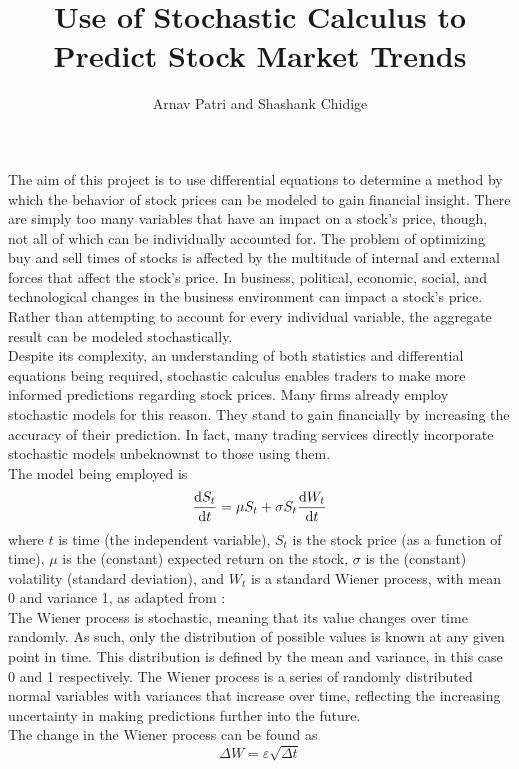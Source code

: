 \documentclass[12pt, A4]{report}
\title{Use of Stochastic Calculus to Predict Stock Market Trends}
\author{Arnav Patri and Shashank Chidige}
\date{}
\begin{document}
	\maketitle
	\noindent
		\maketitle
	\noindent
	The aim of this project is to use differential equations to determine a method by which the behavior of stock prices can be modeled to gain financial insight. There are simply too many variables that have an impact on a stock's price, though, not all of which can be individually accounted for. The problem of optimizing buy and sell times of stocks is affected by the multitude of internal and external forces that affect the stock's price. In business, political, economic, social, and technological changes in the business environment can impact a stock's price. Rather than attempting to account for every individual variable, the aggregate result can be modeled stochastically. \\
	Despite its complexity, an understanding of both statistics and differential equations being required, stochastic calculus enables traders to make more informed predictions regarding stock prices. Many firms already employ stochastic models for this reason. They stand to gain financially by increasing the accuracy of their prediction. In fact, many trading services directly incorporate stochastic models unbeknownst to those using them. \\
	The model being employed is
		\[\dv{S_t}{t} = \mu S_t + \sigma S_t\dv{W_t}{t}\]
		where \(t\) is time (the independent variable), \(S_t\) is the stock price (as a function of time), \(\mu\) is the (constant) expected return on the stock, \(\sigma\) is the (constant) volatility (standard deviation), and \(W_t\) is a standard Wiener process, with mean 0 and variance 1, as adapted from \cite{Stochastic}: \\
		The Wiener process is stochastic, meaning that its value changes over time randomly. As such, only the distribution of possible values is known at any given point in time. This distribution is defined by the mean and variance, in this case 0 and 1 respectively. The Wiener process is a series of randomly distributed normal variables with variances that increase over time, reflecting the increasing uncertainty in making predictions further into the future. \\
		The change in the Wiener process can be found as
		\[\Delta W = \varepsilon\sqrt{\Delta t}\]
\end{document}
